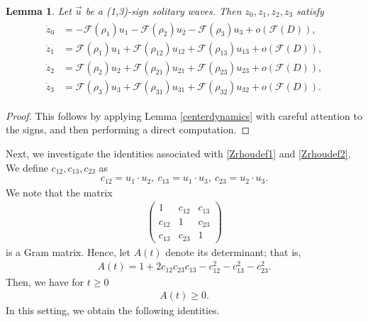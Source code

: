 \documentclass[reqno]{amsart}
\theoremstyle{plain}
\newtheorem{lemma}[theorem]{Lemma}
\theoremstyle{definition}
\numberwithin{equation}{section}
\newcommand{\1}{\mathbbm{1}}
\begin{document}
\begin{lemma}\label{(1,3)centerdynamics}
Let $\vec{u}$ be a (1,3)-sign solitary waves. Then $z_0,z_1,z_2,z_3$ satisfy 
\begin{align}\label{(1,3)zdynamics}
\begin{aligned}
\dot{z}_0&=-\mathcal{F}(\rho_1)u_1-\mathcal{F}(\rho_2)u_2-\mathcal{F}(\rho_3)u_3+o\left(\mathcal{F}(D)\right),
\\
\dot{z}_1&=\mathcal{F}(\rho_1)u_1+\mathcal{F}(\rho_{12})u_{12}+\mathcal{F}(\rho_{13})u_{13}+o\left(\mathcal{F}(D)\right),
\\
\dot{z}_2&=\mathcal{F}(\rho_2)u_2+\mathcal{F}(\rho_{21})u_{21}+\mathcal{F}(\rho_{23})u_{23}+o\left(\mathcal{F}(D)\right),
\\
\dot{z}_3&=\mathcal{F}(\rho_3)u_3+\mathcal{F}(\rho_{31})u_{31}+\mathcal{F}(\rho_{32})u_{32}+o\left(\mathcal{F}(D)\right).
\end{aligned}
\end{align}
\end{lemma}
\begin{proof}
This follows by applying Lemma \ref{centerdynamics} with careful attention to the signs, and then performing a direct computation.
\end{proof}
Next, we investigate the identities associated with \eqref{Zrhoudef1} and \eqref{Zrhoudef2}. We define $c_{12},c_{13},c_{23}$ as 
\begin{align}\label{cdef}
c_{12}=u_1\cdot u_2,\ c_{13}=u_1\cdot u_3,\ c_{23}=u_2\cdot u_3.
\end{align}
We note that the matrix
\begin{align*}
\begin{pmatrix}
1 &c_{12} & c_{13}
\\
c_{12}&1&c_{23}
\\
c_{13}&c_{23}&1
\end{pmatrix}
\end{align*}
is a Gram matrix. Hence, let $A(t)$ denote its determinant; that is,
\begin{align}\label{Adef}
A(t)=1+2c_{12}c_{23}c_{13}-c_{12}^2-c_{13}^2-c_{23}^2.
\end{align}
Then, we have for $t\geq 0$
\begin{align}\label{Apositive}
A(t)\geq 0.
\end{align}
In this setting, we obtain the following identities.
\end{document}
